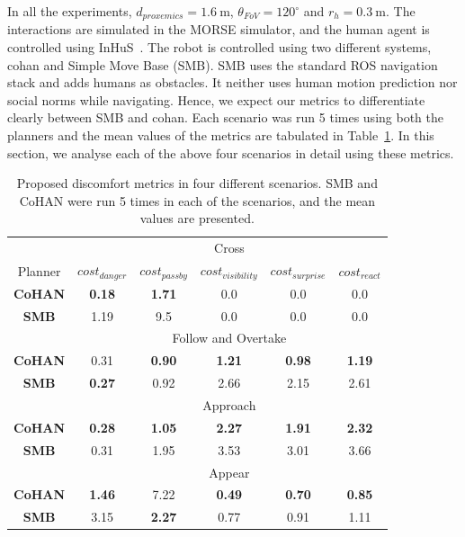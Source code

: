 In all the experiments, $d_{proxemics}=\SI{1.6}{\metre}$, $\theta_{FoV}=120^\circ$ and $r_h = \SI{0.3}{\metre}$. The interactions are simulated in the MORSE simulator, and the human agent is controlled using InHuS~\cite{favier2021intelligent}. The robot is controlled using two different systems, \acrshort{cohan} and Simple Move Base (SMB). SMB uses the standard ROS navigation stack and adds humans as obstacles. It neither uses human motion prediction nor social norms while navigating. Hence, we expect our metrics to differentiate clearly between SMB and \acrshort{cohan}. Each scenario was run 5 times using both the planners and the mean values of the metrics are tabulated in Table~\ref{evaluation_cross}. In this section, we analyse each of the above four scenarios in detail using these metrics.  
\begin{table}[!h]
    \centering
    \begin{tabular}{|c|c|c|c|c|c|}
    \hline
     & \multicolumn{5}{c|}{Cross} \\
    \cline{2-6}
    Planner & $cost_{danger}$ & $cost_{passby}$ & $cost_{visibility}$ & $cost_{surprise}$ & $cost_{react}$ \\
    \hline
    \textbf{CoHAN} &\textbf{0.18} &\textbf{1.71} &0.0 &0.0 &0.0 \\ 
    \hline
    \textbf{SMB} &1.19 &9.5 &0.0 &0.0 &0.0 \\
    \hline
    & \multicolumn{5}{c|}{Follow and Overtake} \\
    \cline{1-6}
        \textbf{CoHAN} &0.31 &\textbf{0.90} &\textbf{1.21} &\textbf{0.98} &\textbf{1.19} \\ 
    \hline
    \textbf{SMB} &\textbf{0.27} &0.92 &2.66 &2.15 &2.61 \\
    \hline
    & \multicolumn{5}{c|}{Approach} \\
    \cline{1-6}
        \textbf{CoHAN} &\textbf{0.28} &\textbf{1.05} &\textbf{2.27} &\textbf{1.91} &\textbf{2.32} \\ 
    \hline
    \textbf{SMB} &0.31 &1.95 &3.53 &3.01 &3.66 \\
    \hline
    & \multicolumn{5}{c|}{Appear} \\
    \cline{1-6}
        \textbf{CoHAN} &\textbf{1.46} &7.22 &\textbf{0.49} &\textbf{0.70} &\textbf{0.85} \\ 
    \hline
    \textbf{SMB} &3.15 &\textbf{2.27} &0.77 &0.91 &1.11 \\
    \hline
    \end{tabular}
    \caption{Proposed discomfort metrics in four different scenarios. SMB and CoHAN were run 5 times in each of the scenarios, and the mean values are presented.}
    \label{evaluation_cross}
\end{table}

